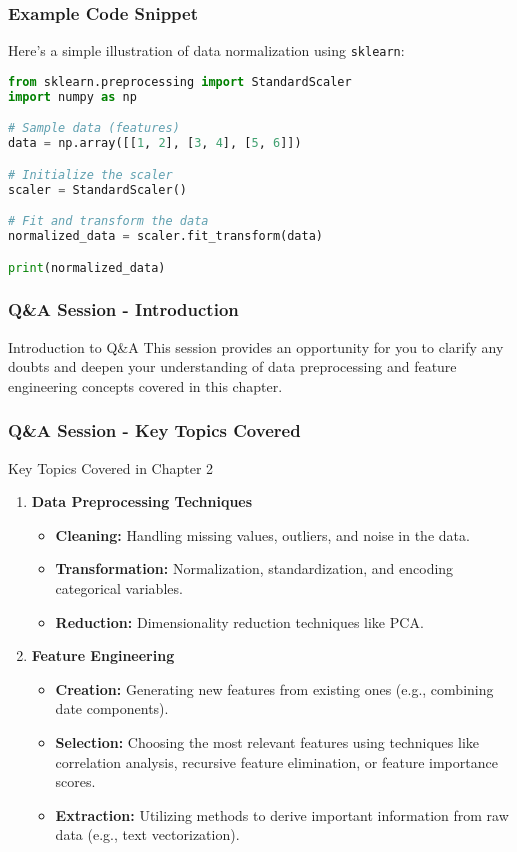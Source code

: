 \documentclass[aspectratio=169]{beamer}
\begin{document}
\begin{frame}[fragile]
    \frametitle{Example Code Snippet}
    Here's a simple illustration of data normalization using \texttt{sklearn}:
    \begin{lstlisting}[language=Python]
from sklearn.preprocessing import StandardScaler
import numpy as np

# Sample data (features)
data = np.array([[1, 2], [3, 4], [5, 6]])

# Initialize the scaler
scaler = StandardScaler()

# Fit and transform the data
normalized_data = scaler.fit_transform(data)

print(normalized_data)
    \end{lstlisting}
\end{frame}

\begin{frame}[fragile]
    \frametitle{Q\&A Session - Introduction}
    \begin{block}{Introduction to Q\&A}
        This session provides an opportunity for you to clarify any doubts and deepen your understanding of data preprocessing and feature engineering concepts covered in this chapter.
    \end{block}
\end{frame}

\begin{frame}[fragile]
    \frametitle{Q\&A Session - Key Topics Covered}
    \begin{block}{Key Topics Covered in Chapter 2}
        \begin{enumerate}
            \item \textbf{Data Preprocessing Techniques}
            \begin{itemize}
                \item \textbf{Cleaning:} Handling missing values, outliers, and noise in the data.
                \item \textbf{Transformation:} Normalization, standardization, and encoding categorical variables.
                \item \textbf{Reduction:} Dimensionality reduction techniques like PCA.
            \end{itemize}
            \item \textbf{Feature Engineering}
            \begin{itemize}
                \item \textbf{Creation:} Generating new features from existing ones (e.g., combining date components).
                \item \textbf{Selection:} Choosing the most relevant features using techniques like correlation analysis, recursive feature elimination, or feature importance scores.
                \item \textbf{Extraction:} Utilizing methods to derive important information from raw data (e.g., text vectorization).
            \end{itemize}
        \end{enumerate}
    \end{block}
\end{frame}
\end{document}
